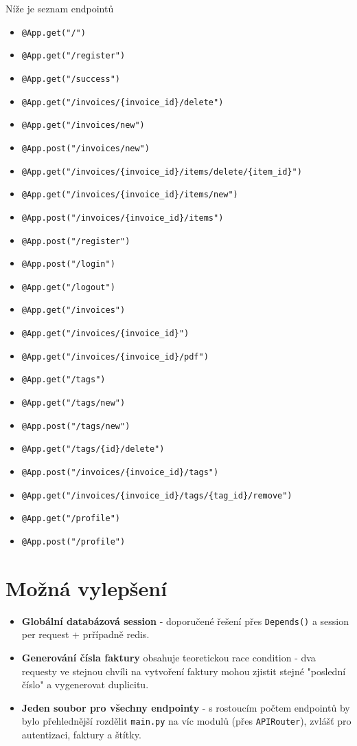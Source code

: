 \documentclass[a4paper,12pt]{article}
\begin{document}
Níže je seznam endpointů
\begin{itemize}
    \item \verb|@App.get("/")|
    \item \verb|@App.get("/register")|
    \item \verb|@App.get("/success")|
    \item \verb|@App.get("/invoices/{invoice_id}/delete")|
    \item \verb|@App.get("/invoices/new")|
    \item \verb|@App.post("/invoices/new")|
    \item \verb|@App.get("/invoices/{invoice_id}/items/delete/{item_id}")|
    \item \verb|@App.get("/invoices/{invoice_id}/items/new")|
    \item \verb|@App.post("/invoices/{invoice_id}/items")|
    \item \verb|@App.post("/register")|
    \item \verb|@App.post("/login")|
    \item \verb|@App.get("/logout")|
    \item \verb|@App.get("/invoices")|
    \item \verb|@App.get("/invoices/{invoice_id}")|
    \item \verb|@App.get("/invoices/{invoice_id}/pdf")|
    \item \verb|@App.get("/tags")|
    \item \verb|@App.get("/tags/new")|
    \item \verb|@App.post("/tags/new")|
    \item \verb|@App.get("/tags/{id}/delete")|
    \item \verb|@App.post("/invoices/{invoice_id}/tags")|
    \item \verb|@App.get("/invoices/{invoice_id}/tags/{tag_id}/remove")|
    \item \verb|@App.get("/profile")|
    \item \verb|@App.post("/profile")|
\end{itemize}
 



\section{Možná vylepšení}
\begin{itemize}
    \item \textbf{Globální databázová session} - doporučené řešení
    přes \texttt{Depends()} a session per request + prřípadně redis.
    \item \textbf{Generování čísla faktury} obsahuje teoretickou race
    condition - dva requesty ve stejnou chvíli na vytvoření faktury mohou zjistit
    stejné "poslední číslo" a vygenerovat duplicitu. 
    \item \textbf{Jeden soubor pro všechny endpointy} - s rostoucím počtem
    endpointů by bylo přehlednější rozdělit \texttt{main.py} na víc modulů
    (přes \texttt{APIRouter}), zvlášť pro autentizaci, faktury a štítky.
  \end{itemize} 
\end{document}
